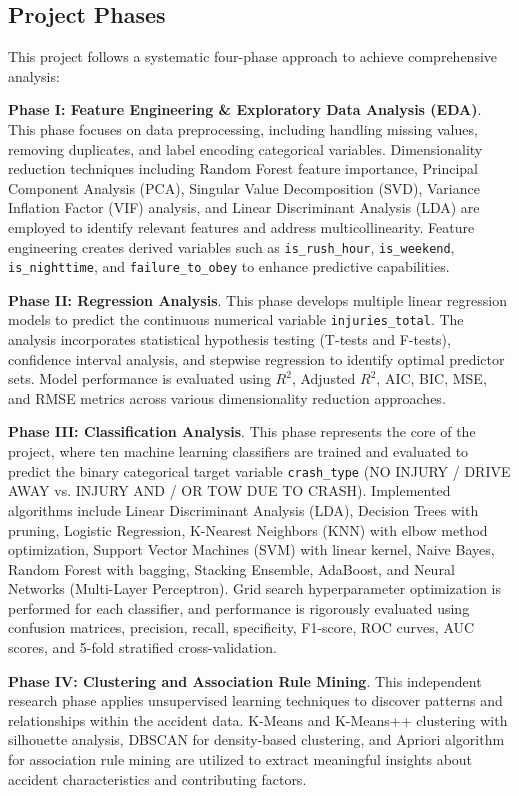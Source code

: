\documentclass[12pt,man]{apa7}
\begin{document}
\subsection{Project Phases}

This project follows a systematic four-phase approach to achieve comprehensive analysis:

\textbf{Phase I: Feature Engineering \& Exploratory Data Analysis (EDA)}. This phase focuses on data preprocessing, including handling missing values, removing duplicates, and label encoding categorical variables. Dimensionality reduction techniques including Random Forest feature importance, Principal Component Analysis (PCA), Singular Value Decomposition (SVD), Variance Inflation Factor (VIF) analysis, and Linear Discriminant Analysis (LDA) are employed to identify relevant features and address multicollinearity. Feature engineering creates derived variables such as \texttt{is\_rush\_hour}, \texttt{is\_weekend}, \texttt{is\_nighttime}, and \texttt{failure\_to\_obey} to enhance predictive capabilities.

\textbf{Phase II: Regression Analysis}. This phase develops multiple linear regression models to predict the continuous numerical variable \texttt{injuries\_total}. The analysis incorporates statistical hypothesis testing (T-tests and F-tests), confidence interval analysis, and stepwise regression to identify optimal predictor sets. Model performance is evaluated using $R^2$, Adjusted $R^2$, AIC, BIC, MSE, and RMSE metrics across various dimensionality reduction approaches.

\textbf{Phase III: Classification Analysis}. This phase represents the core of the project, where ten machine learning classifiers are trained and evaluated to predict the binary categorical target variable \texttt{crash\_type} (NO INJURY / DRIVE AWAY vs. INJURY AND / OR TOW DUE TO CRASH). Implemented algorithms include Linear Discriminant Analysis (LDA), Decision Trees with pruning, Logistic Regression, K-Nearest Neighbors (KNN) with elbow method optimization, Support Vector Machines (SVM) with linear kernel, Naive Bayes, Random Forest with bagging, Stacking Ensemble, AdaBoost, and Neural Networks (Multi-Layer Perceptron). Grid search hyperparameter optimization is performed for each classifier, and performance is rigorously evaluated using confusion matrices, precision, recall, specificity, F1-score, ROC curves, AUC scores, and 5-fold stratified cross-validation.

\textbf{Phase IV: Clustering and Association Rule Mining}. This independent research phase applies unsupervised learning techniques to discover patterns and relationships within the accident data. K-Means and K-Means++ clustering with silhouette analysis, DBSCAN for density-based clustering, and Apriori algorithm for association rule mining are utilized to extract meaningful insights about accident characteristics and contributing factors.
\end{document}
